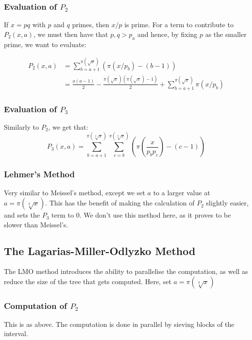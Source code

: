 \documentclass[12pt]{article}
\begin{document}
\subsubsection*{Evaluation of $P_2$}
If $x=pq$ with $p$ and $q$ primes, then $x/p$ is prime. For a term to contribute to $P_2(x,a)$, we must then
have that $p,q>p_a$ and hence, by fixing $p$ as the smaller prime, we want to evaluate:

\begin{align*}
  P_2(x,a)
    &=\sum_{b=a+1}^{\pi(\sqrt{x})}\left(\pi\left(x/p_b\right) - (b - 1)\right)\\
    &=\frac{a(a-1)}{2}-\frac{\pi\left(\sqrt{x}\right)(\pi\left(\sqrt{x}\right)-1)}{2}
      +\sum_{b=a+1}^{\pi(\sqrt{x})}\pi\left(x/p_b\right)
  \end{align*}

\subsubsection*{Evaluation of $P_3$}
Similarly to $P_2$, we get that:
\begin{equation*}
  P_3(x,a)
    =\sum_{b=a+1}^{\pi(\sqrt[3]{x})}\sum_{c=b}^{\pi(\sqrt[3]{x})}\left(\pi\left(\frac{x}{p_bp_c}\right) - (c - 1)\right)
  \end{equation*}

\subsubsection{Lehmer's Method}
Very similar to Meissel's method, except we set $a$ to a larger value at $a=\pi\left(\sqrt[3]{x}\right)$. This
has the benefit of making the calculation of $P_2$ slightly easier, and sets the $P_3$ term to 0. We don't
use this method here, as it proves to be slower than Meissel's.

\subsection{The Lagarias-Miller-Odlyzko Method}
The LMO method introduces the ability to parallelise the computation, as well as reduce the size
of the tree that gets computed. Here, set $a=\pi\left(\sqrt[3]{x}\right)$

\subsubsection{Computation of $P_2$}
This is as above. The computation is done in parallel by sieving blocks of the interval.
\end{document}
